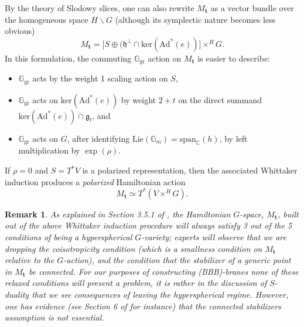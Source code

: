 \documentclass[11pt, a4paper]{amsart}
\numberwithin{equation}{section}
\newtheorem{remark}[theorem]{Remark}
\theoremstyle{definition}
\theoremstyle{remark}
\newcommand{\Ggr}{\mathbb{G}_{\mathrm{gr}}}
\newcommand{\CC}{\mathbb{C}}
\newcommand{\GG}{\mathbb{G}}
\begin{document}
By the theory of Slodowy slices, one can also rewrite $M_{\mathbf{t}}$ as a vector bundle over the homogeneous space $H \backslash G$ (although its symplectic nature becomes less obvious)
\begin{equation}
    M_{\textbf{t}} = \big[S \oplus (\mathfrak{h}^\perp \cap \mathrm{ker}(\mathrm{Ad}^*(e))\big] \times^H G.
\end{equation}
In this formulation, the commuting $\Ggr$ action on $M_{\mathbf{t}}$ is easier to describe: 
\begin{itemize}
\item $\Ggr$ acts by the weight 1 scaling action on $S$, 
\item $\Ggr$ acts on $\mathrm{ker}(\mathrm{Ad}^*(e))$ by weight $2+t$ on the direct summand $\mathrm{ker}(\mathrm{Ad}^*(e)) \cap \mathfrak{g}_t$, and
\item $\Ggr$ acts on $G$, after identifying $\mathrm{Lie}(\GG_m) = \mathrm{span}_\CC(h)$, by left multiplication by $\exp(\rho)$.
\end{itemize}

If $\rho = 0$ and $S = T^*V$ is a polarized representation, then the associated Whittaker induction produces a \textit{polarized} Hamiltonian action
\begin{equation}
    M_{\mathbf{t}} \simeq T^*(V \times^H G).
\end{equation}

\begin{remark}
As explained in Section 3.5.1 of \cite{BZSV}, the Hamiltonian $G$-space, $M_{\mathbf{t}}$, built out of the above Whittaker induction procedure will always satisfy 3 out of the 5 conditions of being a \textit{hyperspherical $G$-variety}; experts will observe that we are dropping the coisotropicity condition (which is a smallness condition on $M_{\mathbf{t}}$ relative to the $G$-action), and the condition that the stabilizer of a generic point in $M_{\mathbf{t}}$ be connected. For our purposes of constructing (BBB)-branes none of these relaxed conditions will present a problem, it is rather in the discussion of $S$-duality that we see consequences of leaving the hyperspherical regime. However, one has evidence (see Section 6 of \cite{toric periods} for instance) that the connected stabilizers assumption is not essential. 
\end{remark}
\end{document}
